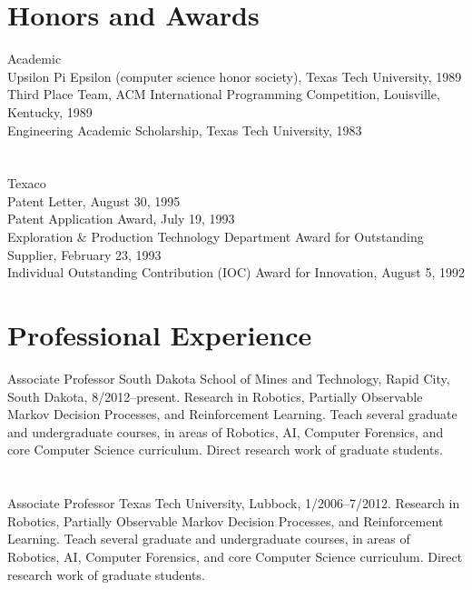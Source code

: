 \documentclass[12pt,letter]{resume}
\begin{document}
\section{Honors and Awards}  
{Academic}   
{\\
Upsilon Pi Epsilon (computer science honor society), Texas Tech University,
1989\\
Third Place Team, ACM International Programming Competition,
Louisville, Kentucky,  1989\\
Engineering Academic Scholarship, Texas Tech University, 1983}

\section{}
{Texaco}   
{\\Patent Letter, August 30, 1995\\
Patent Application Award, July 19, 1993 \\
Exploration \& Production Technology Department Award for 
Outstanding Supplier, February 23, 1993  \\
Individual Outstanding Contribution (IOC) Award for Innovation,
August 5, 1992}


\section{Professional Experience}
{Associate Professor} {South Dakota School of Mines and Technology,
Rapid City, South Dakota, 8/2012--present.
Research in Robotics, Partially Observable Markov Decision Processes, and
Reinforcement Learning.  Teach several graduate and undergraduate courses,
in areas of Robotics, AI, Computer Forensics, and core Computer Science
curriculum.  Direct research work of graduate
students.}

\section{}
{Associate Professor} {Texas Tech University, Lubbock, 1/2006--7/2012.
Research in Robotics, Partially Observable Markov Decision Processes, and
Reinforcement Learning.  Teach several graduate and undergraduate courses,
in areas of Robotics, AI, Computer Forensics, and core Computer Science
curriculum.  Direct research work of graduate
students.}
\end{document}

